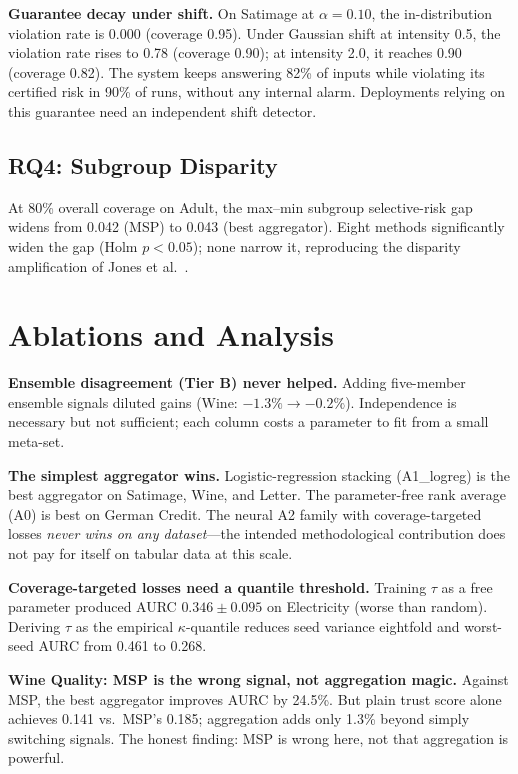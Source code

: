 \documentclass[conference]{IEEEtran}
\begin{document}
\textbf{Guarantee decay under shift.} On Satimage at $\alpha{=}0.10$, the in-distribution violation rate is 0.000 (coverage 0.95). Under Gaussian shift at intensity 0.5, the violation rate rises to 0.78 (coverage 0.90); at intensity 2.0, it reaches 0.90 (coverage 0.82). The system keeps answering 82\% of inputs while violating its certified risk in 90\% of runs, without any internal alarm. Deployments relying on this guarantee need an independent shift detector.

\subsection{RQ4: Subgroup Disparity}

At 80\% overall coverage on Adult, the max--min subgroup selective-risk gap widens from 0.042 (MSP) to 0.043 (best aggregator). Eight methods significantly widen the gap (Holm $p{<}0.05$); none narrow it, reproducing the disparity amplification of Jones et al.~\cite{jones2021disparities}.

\section{Ablations and Analysis}
\label{sec:ablations}

\textbf{Ensemble disagreement (Tier B) never helped.} Adding five-member ensemble signals diluted gains (Wine: $-1.3\% \to -0.2\%$). Independence is necessary but not sufficient; each column costs a parameter to fit from a small meta-set.

\textbf{The simplest aggregator wins.} Logistic-regression stacking (A1\_logreg) is the best aggregator on Satimage, Wine, and Letter. The parameter-free rank average (A0) is best on German Credit. The neural A2 family with coverage-targeted losses \emph{never wins on any dataset}---the intended methodological contribution does not pay for itself on tabular data at this scale.

\textbf{Coverage-targeted losses need a quantile threshold.} Training $\tau$ as a free parameter produced AURC $0.346 \pm 0.095$ on Electricity (worse than random). Deriving $\tau$ as the empirical $\kappa$-quantile reduces seed variance eightfold and worst-seed AURC from 0.461 to 0.268.

\textbf{Wine Quality: MSP is the wrong signal, not aggregation magic.} Against MSP, the best aggregator improves AURC by 24.5\%. But plain trust score alone achieves 0.141 vs.\ MSP's 0.185; aggregation adds only 1.3\% beyond simply switching signals. The honest finding: MSP is wrong here, not that aggregation is powerful.
\end{document}
